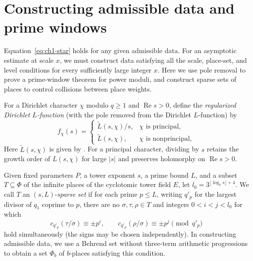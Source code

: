 \section{Constructing admissible data and prime windows}
\label{sec:data-construction}

Equation~\eqref{eq:ch1-star} holds for any given admissible data. For an asymptotic estimate at scale $x$, we must construct data satisfying all the scale, place-set, and level conditions for every sufficiently large integer $x$. Here we use pole removal to prove a prime-window theorem for power moduli, and construct sparse sets of places to control collisions between place weights.

\begin{definition}
\label{def:regular-l}
\emitthmsource
For a Dirichlet character $\chi$ modulo $q\ge1$ and $\operatorname{Re}s>0$, define the \emph{regularized Dirichlet $L$-function} (with the pole removed from the Dirichlet $L$-function) by
\[
 f_\chi(s)=
 \begin{cases}
  \widetilde L(s,\chi)/s,&\chi\text{ is principal},\\
  \widetilde L(s,\chi),&\chi\text{ is nonprincipal},
 \end{cases}
\]
Here $\widetilde L(s,\chi)$ is given by . For a principal character, dividing by $s$ retains the growth order of $L(s,\chi)$ for large $|s|$ and preserves holomorphy on $\operatorname{Re}s>0$.
\end{definition}

\begin{definition}
\label{def:sparse-places}
\emitthmsource
Given fixed parameters $P$, a tower exponent $s$, a prime bound $L$, and a subset $T\subseteq\Phi$ of the infinite places of the cyclotomic tower field $E$, let $l_0=3^{\lfloor\log_3 s\rfloor+4}$. We call $T$ an $(s,L)$-\emph{sparse set} if for each prime $p\le L$, writing $q'_p$ for the largest divisor of $q_1$ coprime to $p$, there are no $\sigma,\tau,\rho\in T$ and integers $0<i<j<l_0$ for which
\[
 c_{q'_p}(\tau/\sigma)\equiv\pm p^i,\qquad c_{q'_p}(\rho/\sigma)\equiv\pm p^j\pmod{q'_p}
\]
hold simultaneously (the signs may be chosen independently). In constructing admissible data, we use a Behrend set without three-term arithmetic progressions to obtain a set $\Phi_b$ of $b$-places satisfying this condition.
\end{definition}


